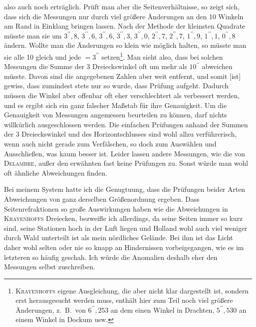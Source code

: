 \begingroup
\makeatletter
\renewcommand{\@makefnmark}{\hbox{\normalfont\textsuperscript{*})}}
\makeatother
\noindent also auch noch erträglich. Prüft man aber die Seitenverhältnisse,
so zeigt sich, dass sich die Messungen nur durch viel größere Änderungen an
den 10 Winkeln am Rand in Einklang bringen lassen. Nach der Methode der
kleinsten Quadrate müsste man sie um
$3^{\prime\prime}{,}8$, $3^{\prime\prime}{,}6$, $3^{\prime\prime}{,}6$, $3^{\prime\prime}{,}3$, $3^{\prime\prime}{,}0$, $2^{\prime\prime}{,}7$, $2^{\prime\prime}{,}7$,
$1^{\prime\prime}{,}9$, $1^{\prime\prime}{,}1$, $0^{\prime\prime}{,}8$ ändern.
Wollte man die Änderungen so klein wie möglich halten, so müsste man sie
alle 10 gleich und jede $=3^{\prime\prime}$ setzen\footnote{\textsc{Krayenhoffs} eigene Ausgleichung, die aber nicht klar dargestellt ist, sondern erst herausgesucht werden muss, enthält hier zum Teil noch viel größere Änderungen, z.\ B.\ von $6^{\prime\prime}{,}253$ an dem einen Winkel in Drachten, $5^{\prime\prime}{,}530$ an einem Winkel in Dockum usw.}.
Man sieht also, dass bei solchen Messungen die Summe der 3 Dreieckswinkel oft
um mehr als $10^{\prime\prime}$ abweichen müsste. Davon sind die angegebenen
Zahlen aber weit entfernt, und somit [ist] gewiss, dass zumindest stets nur
so  wurde, dass  Prüfung aufgeht.
Dadurch müssen die Winkel aber offenbar oft eher verschlechtert als
verbessert werden, und es ergibt sich ein ganz falscher Maßstab für ihre
Genauigkeit. Um die Genauigkeit von Messungen angemessen beurteilen zu können,
darf nichts willkürlich ausgeschlossen werden. Die einfachen Prüfungen
anhand der Summen der 3 Dreieckswinkel und des Horizontschlusses sind wohl
allzu verführerisch, wenn auch nicht gerade zum Verfälschen, so doch zum
Auswählen und Ausschließen, was kaum besser ist. Leider lassen andere
Messungen, wie die von \textsc{Delambre}, außer den erwähnten fast keine
Prüfungen zu. Sonst würde man wohl oft ähnliche Abweichungen finden.

Bei meinem System hatte ich die Genugtuung, dass die Prüfungen beider
Arten Abweichungen von ganz derselben Größenordnung ergeben. Dass
Seitenrefraktionen so große Auswirkungen haben wie die Abweichungen in
\textsc{Krayenhoffs} Dreiecken, bezweifle ich allerdings, da seine Seiten
immer so kurz sind, seine Stationen hoch in der Luft liegen und Holland
wohl auch viel weniger durch Wald unterteilt ist als mein nördliches Gelände.
Bei ihm ist das Licht daher wohl selten oder nie so knapp an Hindernissen
vorbeigegangen, wie es im letzteren so häufig geschah. Ich würde die
Anomalien deshalb eher den Messungen selbst zuschreiben.
\endgroup
